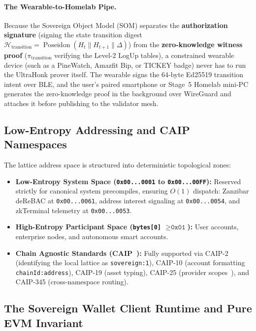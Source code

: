 \documentclass[a4paper,11pt,twoside,parskip=half-,headings=small]{scrartcl}
\newcommand{\code}[1]{\texttt{#1}}
\begin{document}
\paragraph{The Wearable-to-Homelab Pipe.}
Because the Sovereign Object Model (SOM) separates the \textbf{authorization signature} (signing the state transition digest $\mathcal{H}_{\text{transition}} = \operatorname{Poseidon}(H_t \parallel H_{t+1} \parallel \Delta)$) from the \textbf{zero-knowledge witness proof} ($\pi_{\text{transition}}$ verifying the Level-2 LogUp tables), a constrained wearable device (such as a PineWatch, Amazfit Bip, or TICKEY badge) never has to run the UltraHonk prover itself. The wearable signs the 64-byte Ed25519 transition intent over BLE, and the user's paired smartphone or Stage~5 Homelab mini-PC generates the zero-knowledge proof in the background over WireGuard and attaches it before publishing to the validator mesh.

\subsection{Low-Entropy Addressing and CAIP Namespaces}

The lattice address space is structured into deterministic topological zones:
\begin{itemize}
  \item \textbf{Low-Entropy System Space (\code{0x00...0001} to \code{0x00...00FF}):} Reserved
strictly for canonical system precompiles, ensuring $O(1)$ dispatch: Zanzibar deReBAC
at \code{0x00...0061}, address interest signaling at \code{0x00...0054}, and
zkTerminal telemetry at \code{0x00...0053}.
  \item \textbf{High-Entropy Participant Space (\code{bytes[0]} $\ge \code{0x01}$):} User
accounts, enterprise nodes, and autonomous smart accounts.
  \item \textbf{Chain Agnostic Standards (CAIP~\cite{caipstandards}):} Fully supported via
CAIP-2 (identifying the local lattice as \code{sovereign:1}), CAIP-10 (account
formatting \code{chainId:address}), CAIP-19 (asset typing), CAIP-25 (provider scopes~\cite{caip25}), and CAIP-345 (cross-namespace
routing).
\end{itemize}

\subsection{The Sovereign Wallet Client Runtime and Pure EVM Invariant}
\end{document}
